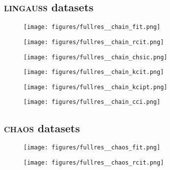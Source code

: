 \subsection{\textsc{lingauss} datasets}

\begin{figure}[!h]
\texttt{[image: figures/fullres\_\_chain\_fit.png]}
\caption{}
\label{fig:result_chain_fit}
\end{figure}

\begin{figure}[!h]
\texttt{[image: figures/fullres\_\_chain\_rcit.png]}
\caption{}
\label{fig:result_chain_rcit}
\end{figure}

\begin{figure}[!h]
\texttt{[image: figures/fullres\_\_chain\_chsic.png]}
\caption{}
\label{fig:result_chain_chsic}
\end{figure}

\begin{figure}[!h]
\texttt{[image: figures/fullres\_\_chain\_kcit.png]}
\caption{}
\label{fig:result_chain_kcit}
\end{figure}

\begin{figure}[!h]
\texttt{[image: figures/fullres\_\_chain\_kcipt.png]}
\caption{}
\label{fig:result_chain_kcipt}
\end{figure}

\begin{figure}[!h]
\texttt{[image: figures/fullres\_\_chain\_cci.png]}
\caption{}
\label{fig:result_chain_cci}
\end{figure}

\FloatBarrier
\subsection{\textsc{chaos} datasets}

\begin{figure}[!h]
\texttt{[image: figures/fullres\_\_chaos\_fit.png]}
\caption{}
\label{fig:result_chaos_fit}
\end{figure}

\begin{figure}[!h]
\texttt{[image: figures/fullres\_\_chaos\_rcit.png]}
\caption{}
\label{fig:result_chaos_rcit}
\end{figure}

